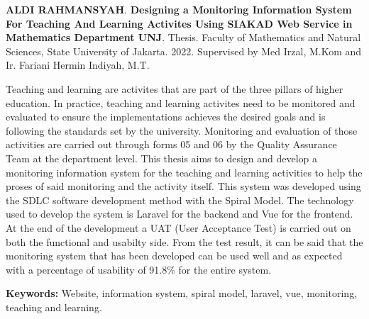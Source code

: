 \documentclass{jtetiskripsi}
\begin{document}
\begin{abstracteng}

\textbf {ALDI RAHMANSYAH}. \textbf {Designing a Monitoring Information System For Teaching And Learning Activites Using SIAKAD Web Service in Mathematics Department UNJ}. Thesis. Faculty of Mathematics and Natural Sciences, State University of Jakarta. 2022. Supervised by Med Irzal, M.Kom and Ir. Fariani Hermin Indiyah, M.T.
\vskip1cm

Teaching and learning are activites that are part of the three pillars of higher education. In practice, teaching and learning activites need to be monitored and evaluated to ensure the implementations achieves the desired goals and is following the standards set by the university. Monitoring and evaluation of those activities are carried out through forms 05 and 06 by the Quality Assurance Team at the department level. This thesis aims to design and develop a monitoring information system for the teaching and learning activities to help the proses of said monitoring and the activity itself. This system was developed using the SDLC software development method with the Spiral Model. The technology used to develop the system is Laravel for the backend and Vue for the frontend. At the end of the development a UAT (User Acceptance Test) is carried out on both the functional and usabilty side. From the test result, it can be said that the monitoring system that has been developed can be used well and as expected with a percentage of usability of 91.8\% for the entire system.

\bigskip
\noindent
\textbf {Keywords:} Website, information system, spiral model, laravel, vue, monitoring, teaching and learning.
\end{abstracteng}



\setcounter{tocdepth}{3}
\tableofcontents 
{}
\listoffigures
{}
\listoftables
{}

\begin{counterpage}
\end{counterpage}

\end{document}
